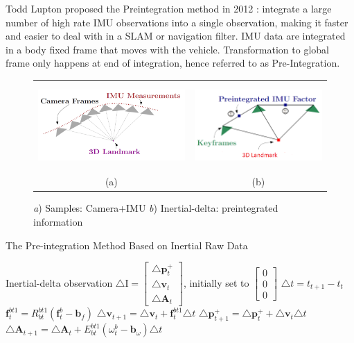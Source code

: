 \documentclass[12pt]{article}   %
\begin{document}
Todd Lupton proposed the Preintegration method in 2012 \cite{Lupton2012}: integrate a large number of high rate IMU observations into a single observation, making it faster and easier to deal with in a SLAM or navigation filter. IMU data are integrated in a body fixed frame that moves with the vehicle. Transformation to global frame only happens at end of integration, hence referred to as Pre-Integration. 
\begin{figure}[!ht]
	\begin{center}\begin{tabular}{cc}
			\includegraphics[height=3.3cm]{figures/IMU-sample_Image-frames_3D_illustration.png}&
			\includegraphics[height=3.3cm]{Figures/Preintegrated-IMU_image_3D_illustration.png}\\
			(a) & (b) \\
		\end{tabular}\end{center}
		\caption{\emph{a}) Samples: Camera+IMU \emph{b}) Inertial-delta: preintegrated information \cite{Manifold2015}} 
		\label{fig:VIN sensor information}
	\end{figure} 

\begin{algorithm}
	\caption{The Pre-integration Method Based on Inertial Raw Data}
	\label{algm:preint}		
	\begin{algorithmic}
	\STATE Inertial-delta observation $ \triangle \bm{\mathrm{I}} = \begin{bmatrix} \triangle \textbf{p}_{t}^+ \\ \triangle \textbf{v}_{t} \\ \triangle \textbf{A} _{t} \end{bmatrix}$, initially set to $\begin{bmatrix} 0 \\ 0 \\ 0 \end{bmatrix}$
		\STATE $\triangle t =  t_{t+1} - t_t$ 
		\STATE $\textbf{f}_t^{bt1} = R_{bt}^{bt1} (\textbf{f}_t^b - \textbf{b}_f)$ 
		\STATE $\triangle \textbf{v}_{t+1} = \triangle \textbf{v}_{t} + \textbf{f}_t^{bt1} \triangle t$ 
		\STATE $\triangle \textbf{p}_{t+1}^+ = \triangle \textbf{p}_{t}^+ + \triangle \textbf{v}_t \triangle t$ 
		\STATE $\triangle \textbf{A} _{t+1} = \triangle \textbf{A} _{t} + E_{bt}^{bt1} (\omega _t^b - \textbf{b}_\omega) \triangle t$ 
		\ENDFOR
	\end{algorithmic}
\end{algorithm}
\end{document}
